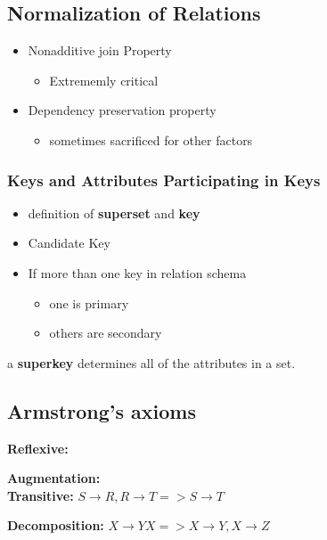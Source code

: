 \documentclass[12pt]{article}
\begin{document}
\subsection{Normalization of Relations}
\begin{itemize}
  \item {
      Nonadditive join Property
      \begin{itemize}
        \item {Extrememly critical}
      \end{itemize}
    }
  \item {
      Dependency preservation property
      \begin{itemize}
        \item {sometimes sacrificed for other factors}
      \end{itemize}
    }
\end{itemize}
\subsubsection{Keys and Attributes Participating in Keys}
\begin{itemize}
  \item {definition of \textbf{superset} and \textbf{key}}
  \item {Candidate Key}
  \item {
    If more than one key in relation schema
    \begin{itemize}
      \item {one is primary}
      \item {others are secondary}
    \end{itemize}
  }
\end{itemize}
a \textbf{superkey} determines all of the attributes in a set.

\subsection{Armstrong's axioms}
\textbf{Reflexive:}

\textbf{Augmentation:}\\
\textbf{Transitive:}
\begin{math}
  S \rightarrow R, R \rightarrow T => S \rightarrow T
\end{math}

\textbf{Decomposition:}
\begin{math}
  X \rightarrow YX => X \rightarrow Y, X \rightarrow Z
\end{math}
\end{document}
